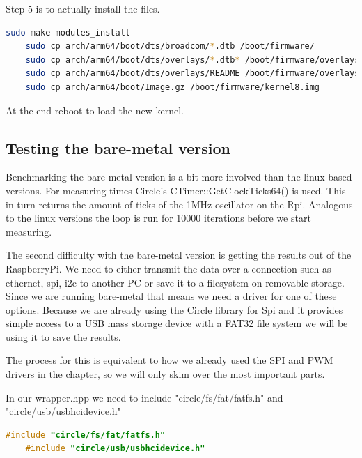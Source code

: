 Step 5 is to actually install the files.
\begin{lstlisting}[language=bash, breaklines]
    sudo make modules_install
    sudo cp arch/arm64/boot/dts/broadcom/*.dtb /boot/firmware/
    sudo cp arch/arm64/boot/dts/overlays/*.dtb* /boot/firmware/overlays/
    sudo cp arch/arm64/boot/dts/overlays/README /boot/firmware/overlays/
    sudo cp arch/arm64/boot/Image.gz /boot/firmware/kernel8.img
\end{lstlisting}

At the end reboot to load the new kernel.

\subsection{Testing the bare-metal version}
Benchmarking the bare-metal version is a bit more involved than the linux based versions.
For measuring times Circle's CTimer::GetClockTicks64() is used. This in turn returns the amount of ticks of the 1MHz oscillator on the Rpi.
Analogous to the linux versions the loop is run for 10000 iterations before we start measuring.

The second difficulty with the bare-metal version is getting the results out of the RaspberryPi.
We need to either transmit the data over a connection such as ethernet, spi, i2c to another PC or save it to a filesystem on removable storage.
Since we are running bare-metal that means we need a driver for one of these options.
Because we are already using the Circle library for Spi and it provides simple access to a USB mass storage device with a FAT32 file system we will be using it to save the results.

The process for this is equivalent to how we already used the SPI and PWM drivers in the  chapter,
so we will only skim over the most important parts.

In our wrapper.hpp we need to include "circle/fs/fat/fatfs.h" and "circle/usb/usbhcidevice.h"
\begin{lstlisting}[language=C++]
    #include "circle/fs/fat/fatfs.h"
    #include "circle/usb/usbhcidevice.h"
\end{lstlisting}


